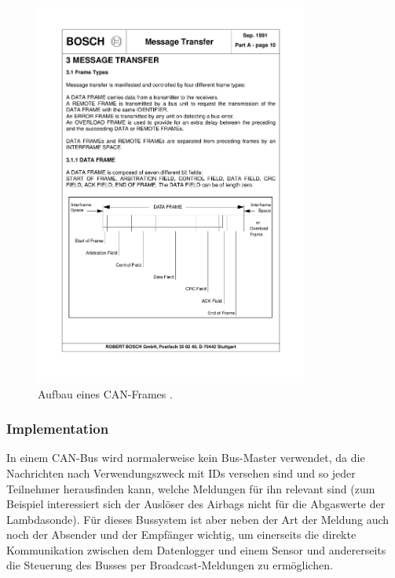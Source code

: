 \begin{figure}
	\centering
		\includegraphics[width=0.8\textwidth]{images/canframe.pdf}
	\caption{Aufbau eines CAN-Frames \cite{boschcanspec2}.}
	\label{fig.canframe}
\end{figure}

\subsubsection{Implementation}
In einem CAN-Bus wird normalerweise kein Bus-Master verwendet, da die Nachrichten nach Verwendungszweck mit IDs versehen sind und so jeder Teilnehmer herausfinden kann, welche Meldungen für ihn relevant sind (zum Beispiel interessiert sich der Auslöser des Airbags nicht für die Abgaswerte der Lambdasonde). Für dieses Bussystem ist aber neben der Art der Meldung auch noch der Absender und der Empfänger wichtig, um einerseits die direkte Kommunikation zwischen dem Datenlogger und einem Sensor und andererseits die Steuerung des Busses per Broadcast-Meldungen zu ermöglichen.



